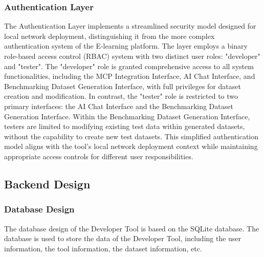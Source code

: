 \documentclass[../Main.tex]{subfiles}
\begin{document}
{{	\subsubsection{Authentication Layer}
	\label{section:4.4.2.2_authentication_layer}
	The Authentication Layer implements a streamlined security model designed for local network deployment, distinguishing it from the more complex authentication system of the E-learning platform. The layer employs a binary role-based access control (RBAC) system with two distinct user roles: "developer" and "tester". The "developer" role is granted comprehensive access to all system functionalities, including the MCP Integration Interface, AI Chat Interface, and Benchmarking Dataset Generation Interface, with full privileges for dataset creation and modification. In contrast, the "tester" role is restricted to two primary interfaces: the AI Chat Interface and the Benchmarking Dataset Generation Interface. Within the Benchmarking Dataset Generation Interface, testers are limited to modifying existing test data within generated datasets, without the capability to create new test datasets. This simplified authentication model aligns with the tool's local network deployment context while maintaining appropriate access controls for different user responsibilities.
	
	
	\subsection{Backend Design}
	\label{section:4.4.3_backend_design}

	\subsubsection{Database Design}
	\label{section:4.4.3.1_database_design}
	The database design of the Developer Tool is based on the SQLite database. The database is used to store the data of the Developer Tool, including the user information, the tool information, the dataset information, etc.

}}
\end{document}
